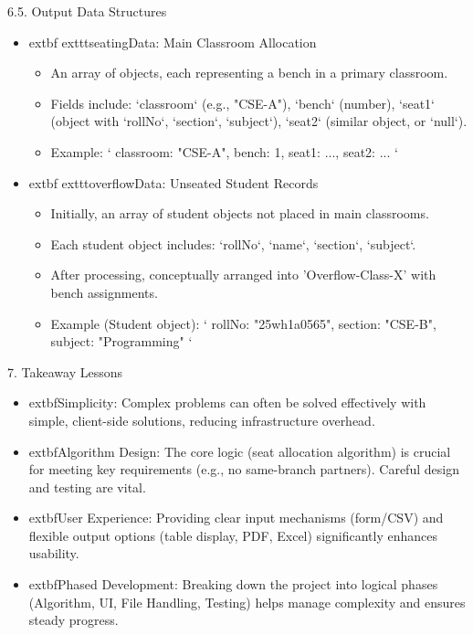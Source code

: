 \documentclass{beamer}
\begin{document}
\begin{frame}{6.5. Output Data Structures}
    \begin{itemize}
        \item 	extbf{	exttt{seatingData}: Main Classroom Allocation}
        \begin{itemize}
            \item An array of objects, each representing a bench in a primary classroom.
            \item Fields include: `classroom` (e.g., "CSE-A"), `bench` (number), `seat1` (object with `rollNo`, `section`, `subject`), `seat2` (similar object, or `null`).
            \item Example: `{ classroom: "CSE-A", bench: 1, seat1: {...}, seat2: {...} }`
        \end{itemize}
        \item 	extbf{	exttt{overflowData}: Unseated Student Records}
        \begin{itemize}
            \item Initially, an array of student objects not placed in main classrooms.
            \item Each student object includes: `rollNo`, `name`, `section`, `subject`.
            \item After processing, conceptually arranged into 'Overflow-Class-X' with bench assignments.
            \item Example (Student object): `{ rollNo: "25wh1a0565", section: "CSE-B", subject: "Programming" }`
        \end{itemize}
    \end{itemize}
\end{frame}

\begin{frame}{7. Takeaway Lessons}
    \begin{itemize}
        \item 	extbf{Simplicity:} Complex problems can often be solved effectively with simple, client-side solutions, reducing infrastructure overhead.
        \item 	extbf{Algorithm Design:} The core logic (seat allocation algorithm) is crucial for meeting key requirements (e.g., no same-branch partners). Careful design and testing are vital.
        \item 	extbf{User Experience:} Providing clear input mechanisms (form/CSV) and flexible output options (table display, PDF, Excel) significantly enhances usability.
        \item 	extbf{Phased Development:} Breaking down the project into logical phases (Algorithm, UI, File Handling, Testing) helps manage complexity and ensures steady progress.
    \end{itemize}
\end{frame}
\end{document}
